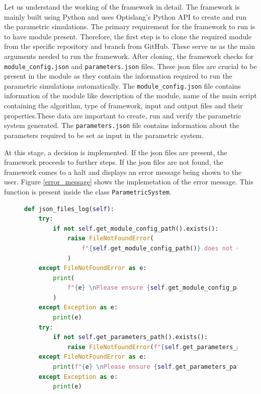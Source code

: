 Let us understand the working of the framework in detail. The framework is mainly built using Python and uses Optislang's Python API to create and run the 
parametric simulations. The primary requirement for the framework to run is to have module present. Therefore, the first step is to clone the required module
from the specific repository and branch from GitHub. These serve us as the main arguments needed to run the framework. After cloning, the framework checks for 
\texttt{module\_config.json} and \texttt{parameters.json} files. These \acrshort{json} files are crucial to be present in the module as they contain the 
information required to run the parametric simulations automatically. The \texttt{module\_config.json} file contains information of 
the module like description of the module, name of the main script containing the algorithm, type of framework, input and output files and their properties.These data are important 
to create, run and verify the parametric system generated. The \texttt{parameters.json} file contains information about the parameters required to be set as input 
in the parametric system.

At this stage, a decision is implemented. If the \acrshort{json} files are present, the framework proceeds to further steps. If the \acrshort{json} files are not found, the framework
comes to a halt and displays an error message being shown to the user. Figure \ref{error_message} shows the implemetation of the error message. This function is present
inside the class \texttt{ParametricSystem}.
\begin{figure}[!ht]
    \centering
    \renewcommand{\lstlistingname}{Code}
    \lstset{style=pythoncode}
    \begin{lstlisting}[language=python, caption= Function to verify existance of \acrshort{json} files, label={error_message}]
def json_files_log(self):
    try:
        if not self.get_module_config_path().exists():
            raise FileNotFoundError(
                f"{self.get_module_config_path()} does not exist"
            )
    except FileNotFoundError as e:
        print(
            f"{e} \nPlease ensure {self.get_module_config_path()} exists and re-run"
        )
    except Exception as e:
        print(e)
    try:
        if not self.get_parameters_path().exists():
            raise FileNotFoundError(f"{self.get_parameters_path()} does not exist")
    except FileNotFoundError as e:
        print(f"{e} \nPlease ensure {self.get_parameters_path} exists and re-run")
    except Exception as e:
        print(e)
\end{lstlisting}
\end{figure}

